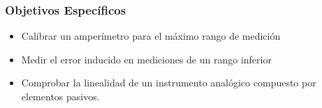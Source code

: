 \subsubsection*{Objetivos Específicos}
\begin{itemize}
    \item Calibrar un amperímetro para el máximo rango de medición
    \item Medir el error inducido en mediciones de un rango inferior 
    \item Comprobar la linealidad de un instrumento analógico compuesto por elementos pasivos.
\end{itemize}